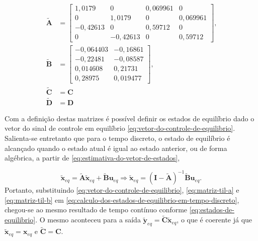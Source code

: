 \begin{subequations}
    \label{eq:matrizes-do-espaco-de-estados-discretizadas}
    \begin{align}
        \mathbf{\tilde{A}} & =
        \begin{bmatrix}
            \label{eq:matriz-til-a}
            1,0179 & 0       & 0,069961 & 0      \\
            0       & 1,0179 & 0      & 0,069961 \\
            -0,42613 & 0       & 0,59712 & 0      \\
            0       & -0,42613  & 0     & 0,59712
        \end{bmatrix}\text{,} \\
        \mathbf{\tilde{B}} & =
        \begin{bmatrix}
            \label{eq:matriz-til-b}
            -0,064403   & -0,16861  \\
            -0,22481    & -0,08587  \\
            0,014608    &  0,21731  \\
            0,28975     & 0,019477
        \end{bmatrix}\text{,} \\
        \mathbf{\tilde{C}} &= \mathbf{C} \\
        \mathbf{\tilde{D}} &= \mathbf{D}
    \end{align}
\end{subequations}

Com a definição destas matrizes é possível definir os estados de equilíbrio dado
o vetor do sinal de controle em equilíbrio
\ref{eq:vetor-do-controle-de-equilibrio}. Salienta-se entretanto que para o
tempo discreto, o estado de equilíbrio é alcançado quando o estado atual é igual
ao estado anterior, ou de forma algébrica, a partir de
\ref{eq:estimativa-do-vetor-de-estados},

\begin{equation}
    \label{eq:calculo-dos-estados-de-equilibrio-em-tempo-discreto}
    \mathbf{\tilde{x}}_{eq} = \mathbf{\tilde{A}}\mathbf{\tilde{x}}_{eq} + \mathbf{\tilde{B}}\mathbf{u}_{eq}
    \Rightarrow
    \mathbf{\tilde{x}}_{eq} = (\mathbf{I}-\mathbf{\tilde{A}})^{-1}\mathbf{\tilde{B}}\mathbf{u}_{eq}.
\end{equation} Portanto, substituindo \ref{eq:vetor-do-controle-de-equilibrio},
\ref{eq:matriz-til-a} e \ref{eq:matriz-til-b} em
\ref{eq:calculo-dos-estados-de-equilibrio-em-tempo-discreto}, chegou-se ao mesmo
resultado de tempo contínuo conforme \ref{eq:estados-de-equilibrio}. O mesmo
aconteceu para a saída $\mathbf{\tilde{y}}_{eq} =
\mathbf{\tilde{C}}\mathbf{\tilde{x}}_{eq}$, o que é coerente já que
$\mathbf{\tilde{x}}_{eq} = \mathbf{x}_{eq}$ e $\mathbf{\tilde{C}} = \mathbf{C}$.

